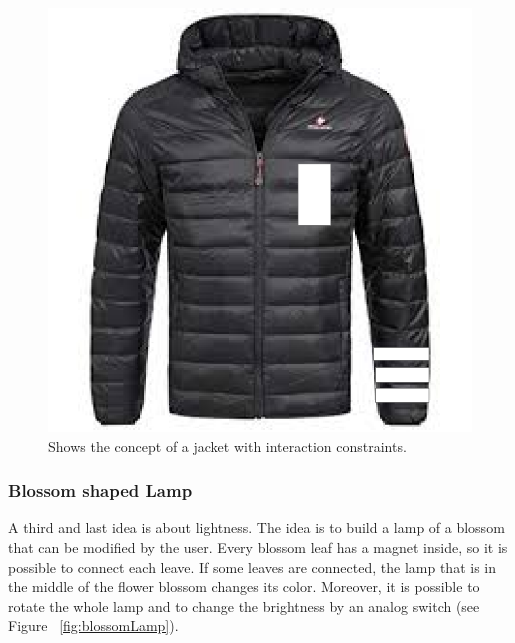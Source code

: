 \documentclass[12pt,twoside,a4paper]{article}
\begin{document}
    \begin{figure}[h!]
        \centering
        \includegraphics[scale=0.2]{images/projectideas/jacket.png}
        \caption{Shows the concept of a jacket with interaction constraints.}
        \label{fig:jacketIdea}
    \end{figure}

    \subsubsection{Blossom shaped Lamp}
    \label{BlossomShapedLamp}
    \begin{flushleft}
        A third and last idea is about lightness. The idea is to build a lamp of a blossom that can be modified by the user.
        Every blossom leaf has a magnet inside, so it is possible to connect each leave. If some leaves are connected, the lamp that 
        is in the middle of the flower blossom changes its color. Moreover, it is possible to rotate the whole lamp and to change the
        brightness by an analog switch (see Figure ~\ref{fig:blossomLamp}).
    \end{flushleft}
\end{document}
